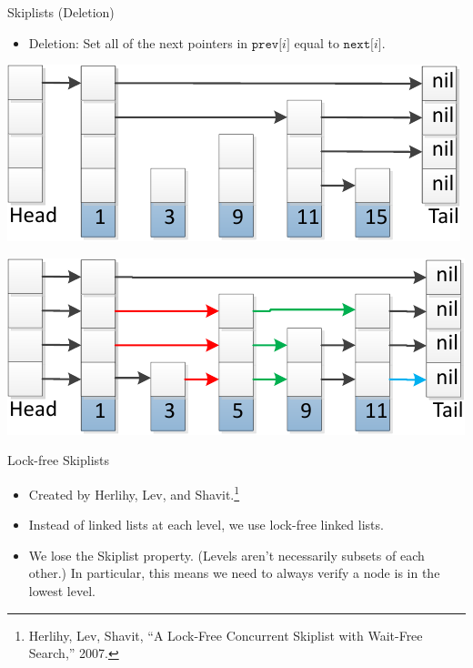 \documentclass{beamer}
\begin{document}
\begin{frame}{Skiplists (Deletion)}
  \begin{itemize}
    \item Deletion: Set all of the next pointers in $\mathtt{prev[}i\mathtt{]}$ 
      equal to $\mathtt{next[}i\mathtt{]}$.
  \end{itemize}
  \begin{center}
    \includegraphics[scale=0.75]{img/skiplistSearch15-crop.pdf}
  \end{center}
  \begin{center}
    \includegraphics[scale=0.75]{img/skiplistInsert5-crop.pdf}
  \end{center}
\end{frame}

\begin{frame}{Lock-free Skiplists}
  \begin{itemize}
    \item Created by Herlihy, Lev, and Shavit.\footnote{Herlihy, Lev, Shavit, ``A Lock-Free Concurrent Skiplist with Wait-Free Search,'' 2007.}
    \item Instead of linked lists at each level, we use lock-free linked lists.
    \item We lose the Skiplist property. (Levels aren't necessarily subsets of each other.) In particular,
      this means we need to always verify a node is in the lowest level.
  \end{itemize}
\end{frame}
\end{document}
